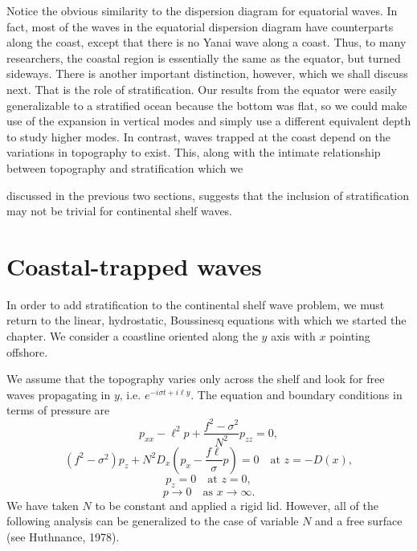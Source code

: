 
Notice the obvious similarity to the dispersion diagram for equatorial waves. In fact,
most of the waves in the equatorial dispersion diagram have counterparts along the
coast, except that there is no Yanai wave along a coast. Thus, to many researchers, the
coastal region is essentially the same as the equator, but turned sideways. There is
another important distinction, however, which we shall discuss next. That is the role
of stratification. Our results from the equator were easily generalizable to a stratified
ocean because the bottom was flat, so we could make use of the expansion in vertical
modes and simply use a different equivalent depth to study higher modes. In contrast,
waves trapped at the coast depend on the variations in topography to exist. This, along
with the intimate relationship between topography and stratification which we

\sourcepagebreak

discussed in the previous two sections, suggests that the inclusion of stratification may
not be trivial for continental shelf waves.

\section{Coastal-trapped waves}

In order to add stratification to the continental shelf wave problem, we must return to
the linear, hydrostatic, Boussinesq equations with which we started the chapter. We
consider a coastline oriented along the $y$ axis with $x$ pointing offshore.


We assume that the topography varies only across the shelf and look for free waves
propagating in $y$, i.e. $e^{-i\sigma t+i\ell y}$. The equation and boundary conditions
in terms of pressure are
\[
	p_{xx}-\ell^2p+\frac{f^2-\sigma^2}{N^2}p_{zz}=0,
\]
\[
	(f^2-\sigma^2)p_z
	+N^2D_x\left(p_x-\frac{f\ell}{\sigma}p\right)=0
	\quad\text{at }z=-D(x),
\]
\[
	p_z=0\quad\text{at }z=0,
\]
\[
	p\to0\quad\text{as }x\to\infty.
\]
We have taken $N$ to be constant and applied a rigid lid. However, all of the following
analysis can be generalized to the case of variable $N$ and a free surface (see
Huthnance, 1978).


